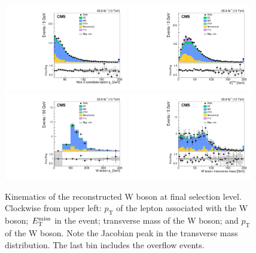 \clearpage

\begin{figure}[!th]
\centering
\includegraphics[width=0.48\textwidth]{figures/dibosons/wz3l/lepWpT_Nminus1.pdf}
\includegraphics[width=0.48\textwidth]{figures/dibosons/wz3l/met_Nminus1.pdf}
\includegraphics[width=0.48\textwidth]{figures/dibosons/wz3l/pTW.pdf}
\includegraphics[width=0.48\textwidth]{figures/dibosons/wz3l/mTW.pdf}
\caption{Kinematics of the reconstructed W boson at final selection level. Clockwise from upper left: 
$p_\mathrm{T}$ of the lepton associated with the W boson;
$E_\mathrm{T}^{\mathrm{miss}}$ in the event; transverse mass of the W boson;
and $p_\mathrm{T}$ of the W boson.
Note the Jacobian peak in the transverse mass distribution.
The last bin includes the overflow events.
\label{fig:wz3l_w}}
\end{figure}


